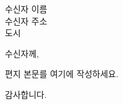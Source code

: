 \documentclass{letter}
\begin{document}
\begin{letter}{수신자 이름 \\ 수신자 주소 \\ 도시}
\opening{수신자께,}

편지 본문를 여기에 작성하세요.

\closing{감사합니다.}

\end{letter}
\end{document}
